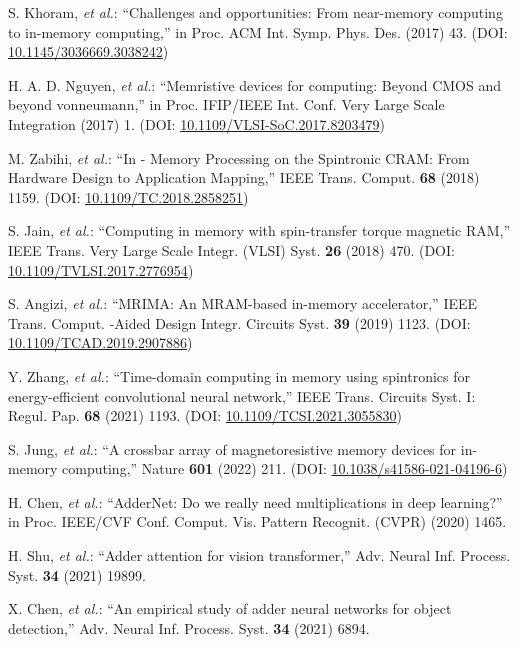 \documentclass[submit]{elex2024}%
\begin{document}
\begin{thebibliography}{99}
S. Khoram, {\it et al.}: ``Challenges and opportunities: From near-memory computing to in-memory computing,'' in Proc. ACM Int. Symp. Phys. Des. (2017) 43. (DOI: \href{https://doi.org/10.1145/3036669.3038242}{10.1145/3036669.3038242})

H. A. D. Nguyen, {\it et al.}: ``Memristive devices for computing: Beyond CMOS and beyond vonneumann,'' in Proc. IFIP/IEEE Int. Conf. Very Large Scale Integration (2017) 1. (DOI: \href{https://doi.org/10.1109/VLSI-SoC.2017.8203479}{10.1109/VLSI-SoC.2017.8203479})

M. Zabihi, {\it et al.}: ``In - Memory Processing on the Spintronic CRAM: From Hardware Design to Application Mapping,'' IEEE Trans. Comput. {\bf 68} (2018) 1159. (DOI: \href{https://doi.org/10.1109/TC.2018.2858251}{10.1109/TC.2018.2858251})

S. Jain, {\it et al.}: ``Computing in memory with spin-transfer torque magnetic RAM,'' IEEE Trans. Very Large Scale Integr. (VLSI) Syst. {\bf 26} (2018) 470. (DOI: \href{https://doi.org/10.1109/TVLSI.2017.2776954}{10.1109/TVLSI.2017.2776954})

S. Angizi, {\it et al.}: ``MRIMA: An MRAM-based in-memory accelerator,'' IEEE Trans. Comput. -Aided Design Integr. Circuits Syst. {\bf 39} (2019) 1123. (DOI: \href{https://doi.org/10.1109/TCAD.2019.2907886}{10.1109/TCAD.2019.2907886})

Y. Zhang, {\it et al.}: ``Time-domain computing in memory using spintronics for energy-efficient convolutional neural network,'' IEEE Trans. Circuits Syst. I: Regul. Pap. {\bf 68} (2021) 1193. (DOI: \href{https://doi.org/10.1109/TCSI.2021.3055830}{10.1109/TCSI.2021.3055830})

S. Jung, {\it et al.}: ``A crossbar array of magnetoresistive memory devices for in-memory computing,'' Nature {\bf 601} (2022) 211. (DOI: \href{https://doi.org/10.1038/s41586-021-04196-6}{10.1038/s41586-021-04196-6})

H. Chen, {\it et al.}: ``AdderNet: Do we really need multiplications in deep learning?'' in Proc. IEEE/CVF Conf. Comput. Vis. Pattern Recognit. (CVPR) (2020) 1465.

H. Shu, {\it et al.}: ``Adder attention for vision transformer,'' Adv. Neural Inf. Process. Syst. {\bf 34} (2021) 19899. 

X. Chen, {\it et al.}: ``An empirical study of adder neural networks for object detection,'' Adv. Neural Inf. Process. Syst. {\bf 34} (2021) 6894.


\end{thebibliography}
\end{document}
